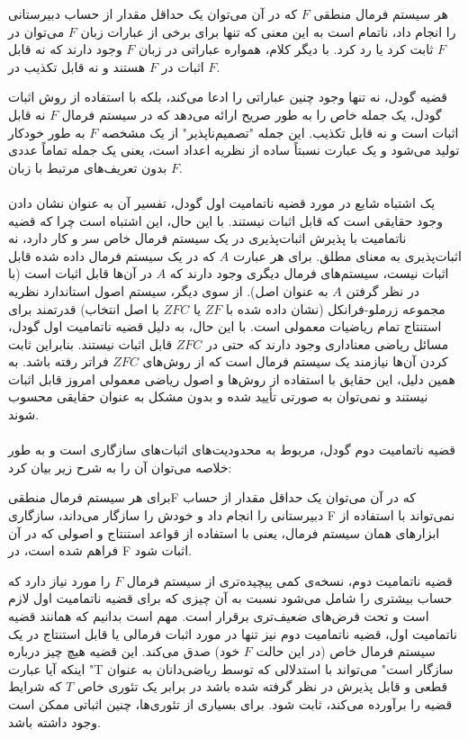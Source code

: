 \documentclass[10pt,a4paper]{article}
\begin{document}
                            \begin{qt}
هر سیستم فرمال منطقی $F$ که در آن می‌توان یک حداقل مقدار از حساب دبیرستانی را انجام داد، ناتمام است به این معنی که تنها برای برخی از عبارات زبان $F$ می‌توان در $F$ ثابت کرد یا رد کرد. با دیگر کلام، همواره عباراتی در زبان $F$ وجود دارند که نه قابل اثبات در $F$ هستند و نه قابل تکذیب در $F$.
                            \end{qt}
قضیه گودل، نه تنها وجود چنین عباراتی را ادعا می‌کند، بلکه با استفاده از روش اثبات گودل، یک جمله خاص را به طور صریح ارائه می‌دهد که در سیستم فرمال $F$ نه قابل اثبات است و نه قابل تکذیب. این جمله "تصمیم‌ناپذیر" از یک مشخصه $F$ به طور خودکار تولید می‌شود و یک عبارت نسبتاً ساده از نظریه اعداد است، یعنی یک جمله تماماً عددی بدون تعریف‌های مرتبط با زبان $F$.
                            \\
                            \\
 یک اشتباه شایع در مورد قضیه ناتمامیت اول گودل، تفسیر آن به عنوان نشان دادن وجود حقایقی است که قابل اثبات نیستند. با این حال، این اشتباه است چرا که قضیه ناتمامیت با پذیرش اثبات‌پذیری در یک سیستم فرمال خاص سر و کار دارد، نه اثبات‌پذیری به معنای مطلق. برای هر عبارت $A$ که در یک سیستم فرمال داده شده قابل اثبات نیست، سیستم‌های فرمال دیگری وجود دارند که $A$ در آن‌ها قابل اثبات است (با در نظر گرفتن $A$ به عنوان اصل). از سوی دیگر، سیستم اصول استاندارد نظریه مجموعه زرملو-فرانکل (نشان داده شده با $ZF$ یا $ZFC$ با اصل انتخاب) قدرتمند برای استنتاج تمام ریاضیات معمولی است. با این حال، به دلیل قضیه ناتمامیت اول گودل، مسائل ریاضی معناداری وجود دارند که حتی در $ZFC$ قابل اثبات نیستند. بنابراین ثابت کردن آن‌ها نیازمند یک سیستم فرمال است که از روش‌های $ZFC$ فراتر رفته باشد. به همین دلیل، این حقایق با استفاده از روش‌ها و اصول ریاضی معمولی امروز قابل اثبات نیستند و نمی‌توان به صورتی تأیید شده و بدون مشکل به عنوان حقایقی محسوب شوند.\cite{Hajek2007-fq}
                            \\
                            \\
قضیه ناتمامیت دوم گودل، مربوط به محدودیت‌های اثبات‌های سازگاری است و به طور خلاصه می‌توان آن را به شرح زیر بیان کرد:
                            \begin{qt}
برای هر سیستم فرمال منطقیF که در آن می‌توان یک حداقل مقدار از حساب دبیرستانی را انجام داد و خودش را سازگار می‌داند، سازگاری F نمی‌تواند با استفاده از ابزارهای همان سیستم فرمال، یعنی با استفاده از قواعد استنتاج و اصولی که در آن فراهم شده است، در F اثبات شود. 
                            \end{qt}
قضیه ناتمامیت دوم، نسخه‌ی کمی پیچیده‌تری از سیستم فرمال $F$ را مورد نیاز دارد که حساب بیشتری را شامل می‌شود نسبت به آن چیزی که برای قضیه ناتمامیت اول لازم است و تحت فرض‌های ضعیف‌تری برقرار است. مهم است بدانیم که همانند قضیه ناتمامیت اول، قضیه ناتمامیت دوم نیز تنها در مورد اثبات فرمالی یا قابل استنتاج در یک سیستم فرمال خاص (در این حالت $F$ خود) صدق می‌کند. این قضیه هیچ چیز درباره اینکه آیا عبارت "T سازگار است" می‌تواند با استدلالی که توسط ریاضی‌دانان به عنوان قطعی و قابل پذیرش در نظر گرفته شده باشد در برابر یک تئوری خاص $T$ که شرایط قضیه را برآورده می‌کند، ثابت شود. برای بسیاری از تئوری‌ها، چنین اثباتی ممکن است وجود داشته باشد.
                            
\end{document}
